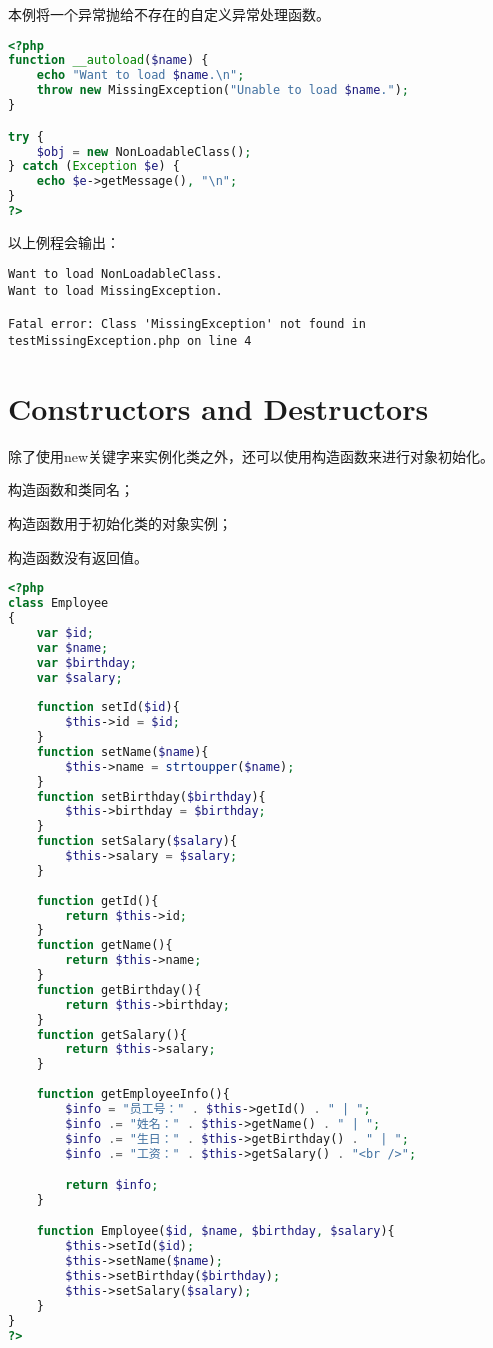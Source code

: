 本例将一个异常抛给不存在的自定义异常处理函数。

\begin{lstlisting}[language=PHP]
<?php
function __autoload($name) {
    echo "Want to load $name.\n";
    throw new MissingException("Unable to load $name.");
}

try {
    $obj = new NonLoadableClass();
} catch (Exception $e) {
    echo $e->getMessage(), "\n";
}
?>
\end{lstlisting}

以上例程会输出：

\begin{verbatim}
Want to load NonLoadableClass.
Want to load MissingException.

Fatal error: Class 'MissingException' not found in testMissingException.php on line 4
\end{verbatim}

\chapter{Constructors and Destructors}

除了使用new关键字来实例化类之外，还可以使用构造函数来进行对象初始化。

\begin{compactitem}
\item 构造函数和类同名；
\item 构造函数用于初始化类的对象实例；
\item 构造函数没有返回值。
\end{compactitem}


\begin{lstlisting}[language=PHP]
<?php
class Employee
{
	var $id;
	var $name;
	var $birthday;
	var $salary;
	
	function setId($id){
		$this->id = $id;
	}
	function setName($name){
		$this->name = strtoupper($name);
	}
	function setBirthday($birthday){
		$this->birthday = $birthday;
	}
	function setSalary($salary){
		$this->salary = $salary;
	}
	
	function getId(){
		return $this->id;
	}
	function getName(){
		return $this->name;
	}
	function getBirthday(){
		return $this->birthday;
	}
	function getSalary(){
		return $this->salary;
	}
	
	function getEmployeeInfo(){
		$info = "员工号：" . $this->getId() . " | ";
		$info .= "姓名：" . $this->getName() . " | ";
		$info .= "生日：" . $this->getBirthday() . " | ";
		$info .= "工资：" . $this->getSalary() . "<br />";

		return $info;
	}

	function Employee($id, $name, $birthday, $salary){
		$this->setId($id);
		$this->setName($name);
		$this->setBirthday($birthday);
		$this->setSalary($salary);
	}
}
?>
\end{lstlisting}

